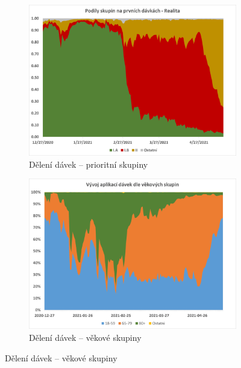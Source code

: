 \begin{figure}
\begin{subfigure}{0.45\textwidth}
\includegraphics[width=\textwidth]{assets/theta_real}
\caption{Dělení dávek -- prioritní skupiny}
\label{gr_real_theta}
\end{subfigure}
%
\begin{subfigure}{0.45\textwidth}
\includegraphics[width=\textwidth]{assets/chart_vek}
\caption{Dělení dávek -- věkové skupiny}
\label{gr_skupiny_davky_vek}
\end{subfigure}



\end{figure}
